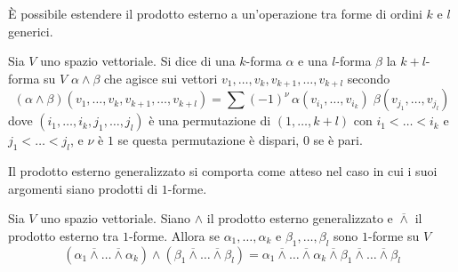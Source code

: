 È possibile estendere il prodotto esterno a un'operazione tra forme di ordini $k$ e $l$ generici.
\begin{definition}
  Sia $V$ uno spazio vettoriale. Si dice  di una $k$-forma $\alpha$ e una $l$-forma $\beta$ la $k+l$-forma su $V$ $\alpha \wedge \beta$ che agisce sui vettori $v_1, \ldots, v_k, v_{k+1}, \ldots, v_{k+l}$ secondo
\begin{equation*}
(\alpha \wedge \beta) (v_1, \ldots, v_k, v_{k+1}, \ldots, v_{k+l}) = \sum (-1)^{\nu}\, \alpha(v_{i_1}, \ldots, v_{i_k})\; \beta(v_{j_1}, \ldots, v_{j_l})
\end{equation*} 
dove $(i_1, \ldots, i_k, j_1, \ldots, j_l)$ è una permutazione di $(1, \ldots, k+l)$ con $i_1 < \ldots < i_k$ e $j_1 < \ldots < j_l$, e $\nu$ è $1$ se questa permutazione è dispari, $0$ se è pari.
\end{definition}

Il prodotto esterno generalizzato si comporta come atteso nel caso in cui i suoi argomenti siano prodotti di $1$-forme.
\begin{theorem}
  Sia $V$ uno spazio vettoriale. Siano $\wedge$ il prodotto esterno generalizzato e $\overline{\wedge}$ il prodotto esterno tra $1$-forme. Allora se $\alpha_1, \ldots, \alpha_k$ e $\beta_1, \ldots, \beta_l$ sono $1$-forme su $V$ \begin{equation*}
  (\alpha_1 \overline{\wedge} \ldots \overline{\wedge} \alpha_k) \wedge (\beta_1 \overline{\wedge} \ldots \overline{\wedge} \beta_l) = \alpha_1 \overline{\wedge} \ldots \overline{\wedge} \alpha_k \overline{\wedge} \beta_1 \overline{\wedge} \ldots \overline{\wedge} \beta_l
  \end{equation*} 
\end{theorem}

